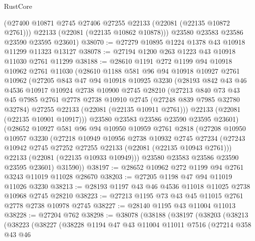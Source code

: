 \begin{lexlean}{RustCore}
\begin{coremodule}
        (@27400 @10871 @2745 @27406 @27255 @22133 (@22081 (@22135 @10872 @2761)))
        @22133
        (@22081 (@22135 @10862 @10878)))
      @23580
      @23583
      @23586
      @23590
      @23595
      @23601)
@38070 := @27279 @10895 @1224 @1378 @43 @10918 @11299 @11323 @13127
@38078 := @27194 @1200 @263 @1223 @43 @10918 @11030 @2761 @11299
@38188 := @28610
    @1191
    @272
    @1199
    @94
    @10918
    @10962
    @2761
    @11030
    (@28610
      @1188
      @581
      @96
      @94
      @10918
      @10927
      @2761
      @10962
      (@27205
        @843
        @47
        @94
        @10918
        @10925
        @3230
        (@28193
          @842
          @43
          @46
          @4536
          @10917
          @10924
          @2738
          @10900
          @2745
          @28210
          (@27213
            @840
            @73
            @43
            @45
            @7985
            @2761
            @2778
            @2738
            @10910
            @2745
            (@27248 @839 @7985 @32780 @32784)
            @27255
            @22133
            (@22081 (@22135 @10911 @2761)))
          @22133
          (@22081 (@22135 @10901 @10917)))
        @23580
        @23583
        @23586
        @23590
        @23595
        @23601)
      (@28652
        @10927
        @581
        @96
        @94
        @10950
        @10959
        @2761
        @2818
        (@27208
          @10950
          @10957
          @3230
          (@27218
            @10949
            @10956
            @2738
            @10932
            @2745
            @27234
            (@27243 @10942 @2745 @27252 @27255 @22133 (@22081 (@22135 @10943 @2761)))
            @22133
            (@22081 (@22135 @10933 @10949)))
          @23580
          @23583
          @23586
          @23590
          @23595
          @23601)
        @31590))
@38197 := @28652 @10962 @272 @1199 @94 @2761 @3243 @11019 @11028 @28670
@38203 := @27205 @1198 @47 @94 @11019 @11026 @3230
@38213 := @28193 @1197 @43 @46 @4536 @11018 @11025 @2738 @10968 @2745 @28210
@38223 := @27213 @1195 @73 @43 @45 @11015 @2761 @2778 @2738 @10978 @2745
@38227 := @28140 @1195 @43 @11004 @11013
@38228 := @27204 @762
@38298 := @38078
    (@38188
      (@38197
        (@38203
          (@38213
            (@38223
              (@38227
                (@38228
                  @1194
                  @47
                  @43
                  @11004
                  @11011
                  @7516
                  (@27214
                    @358
                    @43
                    @46

\end{coremodule}
\end{lexlean}

